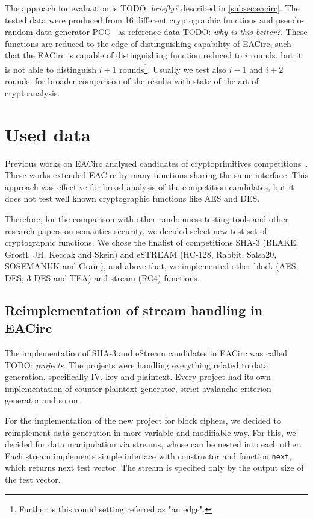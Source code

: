 \documentclass[
  print, %
  Table,   %
  nolof,     %
  nolot,     %
  11pt, %
  oneside  %
]{fithesis3}
\newcommand{\todo}[1]{TODO: \textit{#1}}
\begin{document}
The approach for evaluation is \todo{briefly?} described in \cref{subsec:eacirc}. The tested data were produced from 16 different cryptographic functions and pseudo-random data generator PCG~\cite{pcgGen} as reference data \todo{why is this better?}. These functions are reduced to the edge of distinguishing capability of EACirc, such that the EACirc is capable of distinguishing function reduced to $i$ rounds, but it is not able to distinguish $i+1$ rounds\footnote{Further is this round setting referred as "an edge".}. Usually we test also $i-1$ and $i+2$ rounds, for broader comparison of the results with state of the art of cryptoanalysis.

\section{Used data}
\label{sec:method-data}

Previous works on EACirc analysed candidates of cryptoprimitives competitions~\cite{estreamMgrThesis,sha3Thesis,ukropMgrThesis}. These works extended EACirc by many functions sharing the same interface. This approach was effective for broad analysis of the competition candidates, but it does not test well known cryptographic functions like AES and DES.

Therefore, for the comparison with other randomness testing tools and other research papers on semantics security, we decided select new test set of cryptographic functions. We chose the finalist of competitions SHA-3 (BLAKE, Grostl, JH, Keccak and Skein) and eSTREAM (HC-128, Rabbit, Salsa20, SOSEMANUK and Grain), and above that, we implemented other block (AES, DES, 3-DES and TEA) and stream (RC4) functions.

\subsection{Reimplementation of stream handling in EACirc}
\label{subsec:method-data-streams}

The implementation of SHA-3 and eStream candidates in EACirc was called \todo{projects}. The projects were handling everything related to data generation, specifically IV, key and plaintext. Every project had its own implementation of counter plaintext generator, strict avalanche criterion generator and so on.

For the implementation of the new project for block ciphers, we decided to reimplement data generation in more variable and modifiable way. For this, we decided for data manipulation via streams, whose can be nested into each other. Each stream implements simple interface with constructor and function \texttt{next}, which returns next test vector. The stream is specified only by the output size of the test vector.
\end{document}
